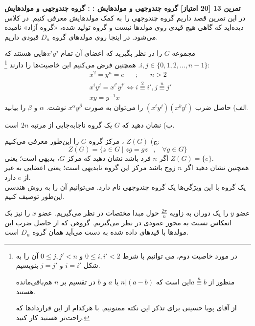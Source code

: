 \documentclass{article}
\newenvironment{exercise}[3][\unskip]{%
	\par
	\noindent
	\textbf{تمرین
		#1
		[#2 امتیاز] 
		\def\temp{#3}\ifx\temp\empty
		: 
		\else
		: #3 \vspace{0.5em} \\ \noindent
		\fi
}}{}
\begin{document}
\begin{exercise}[13]{20}{گروه چندوجهی و مولدهایش}
	در این تمرین قصد داریم گروه چندوجهی را به کمک مولدهایش معرفی کنیم. در کلاس دیده‌اید که گاهی هیچ قیدی روی مولدها نیست و گروه تولید شده، «گروه آزاد» نامیده می‌شود. در اینجا روی مولدهای گروه 
	$D_n$
	قیودی داریم.
	
	\noindent
	مجموعه 
	$G$ 
	را در نظر بگیرید که اعضای آن تمام 
	$x^i y^j$هایی هستند که 
	$i,j \in \{0,1,2,...,n-1\}$. 
	همچنین فرض می‌کنیم این خاصیت‌ها را دارند
	\footnote{در مورد خاصیت دوم،  
	می توانیم با شرط 
	$0\leq i,i' <2$  و 
	$0 \leq j,j' < n$
	آن را به شکل 
	$i=i'$
	و
	$j=j'$
	بنویسیم.
	
	منظور از $a \stackrel{n}{\equiv} b$‌این است که 
	$n|(a-b)$
	یا $a$ و $b$ در تقسیم بر $n$ هم‌باقی‌مانده هستند. 
	
	 از آقای پویا حسینی برای تذکر این نکته ممنونیم. با هرکدام از این قراردادها که راحت‌تر هستید کار کنید.
	}:
	\begin{equation*}
		\begin{aligned}
			&x^2=y^n=e \;\;\;\;\;\; ; \;\;\;\;\;\; n>2\\
			&x^i y^j =x^{i'} y^{j'} \Longleftrightarrow i \stackrel{2}{\equiv} i', j \stackrel{n}{\equiv} j'\\
			&xy=y^{-1}x
		\end{aligned}
	\end{equation*}
	الف) حاصل ضرب 
	$(x^i y^j)(x^k y^l)$ 
	را می‌توان به صورت 
	$x^{\alpha}y^{\beta}$ 
	نوشت. 
	$\alpha$
	و
	$\beta$
	را بیابید. 
	
	\noindent
	ب) نشان دهید که 
	$G$ 
	یک گروه ناجابه‌جایی از مرتبه 
	$2n$ 
	است. 
	
	\noindent
	ج) 
	$Z(G)$ ،
	مرکز
	گروه 
	$G$ 
	را این‌طور معرفی می‌کنیم:
	\begin{equation*}
		Z(G)=\{z\in G \;\big| \; zg=gz  \;\;\; , \;\;\; \forall g \in G \}
	\end{equation*}
	اگر 
	$n$ 
	فرد باشد نشان دهید که مرکز
	$G$، 
	بدیهی است؛ یعنی $Z(G) = \{e\}$. 
	\\
	همچنین نشان دهید اگر 
	$n$ 
	زوج باشد مرکز این گروه نابدیهی است؛ یعنی اعضایی به غیر از
	$e$ 
	دارد.
	\\
	یک گروه با این ویژگی‌ها یک گروه چندوجهی  
	نام دارد. می‌توانیم آن را به روش هندسی این‌طور توصیف کنیم. 
	\\
	\begin{mdframed}
			
		عضو
		$y$ 
		را یک دوران به زاویه 
		$\frac{2\pi}{n}$ 
		حول مبدا مختصات در نظر می‌گیریم. عضو
		$x$ 
		را نیز یک انعکاس نسبت به محور عمودی در نظر می‌گیریم. 
		گروهی که از حاصل ضرب این مولدها با قید‌های داده شده به دست می‌آيد همان گروه 
		$D_n$ 
		است.
	\end{mdframed}
\end{exercise}
\end{document}
